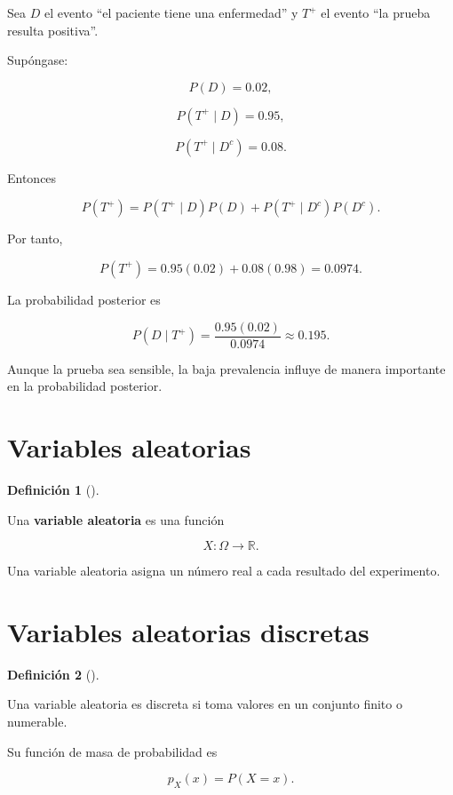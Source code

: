 \documentclass[
  spanish,
  11pt,
  letterpaper,
  DIV=11,
  numbers=noendperiod]{scrreprt}
\theoremstyle{definition}
\newtheorem{definition}{Definición}[chapter]
\theoremstyle{plain}
\theoremstyle{definition}
\theoremstyle{remark}
\begin{document}
Sea \(D\) el evento ``el paciente tiene una enfermedad'' y \(T^+\) el
evento ``la prueba resulta positiva''.

Supóngase:

\[
P(D)=0.02,
\]

\[
P(T^+\mid D)=0.95,
\]

\[
P(T^+\mid D^c)=0.08.
\]

Entonces

\[
P(T^+)
=
P(T^+\mid D)P(D)
+
P(T^+\mid D^c)P(D^c).
\]

Por tanto,

\[
P(T^+)
=
0.95(0.02)+0.08(0.98)
=
0.0974.
\]

La probabilidad posterior es

\[
P(D\mid T^+)
=
\frac{0.95(0.02)}{0.0974}
\approx 0.195.
\]

Aunque la prueba sea sensible, la baja prevalencia influye de manera
importante en la probabilidad posterior.

\section{Variables aleatorias}\label{variables-aleatorias}

\begin{definition}[]\protect\hypertarget{def-variable-aleatoria}{}\label{def-variable-aleatoria}

Una \textbf{variable aleatoria} es una función

\[
X:\Omega\to\mathbb{R}.
\]

\end{definition}

Una variable aleatoria asigna un número real a cada resultado del
experimento.

\section{Variables aleatorias
discretas}\label{variables-aleatorias-discretas}

\begin{definition}[]\protect\hypertarget{def-variable-discreta}{}\label{def-variable-discreta}

Una variable aleatoria es discreta si toma valores en un conjunto finito
o numerable.

\end{definition}

Su función de masa de probabilidad es

\[
p_X(x)
=
P(X=x).
\]
\end{document}
